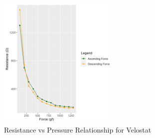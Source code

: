 \begin{figure}[b]
    \vspace{-0.7cm}
      \centering
      \includegraphics[width=0.5\textwidth]{figs/ascending_descending.png}
      \vspace{-0.2cm}
      \caption[Resistance vs Pressure Relationship]{Resistance vs Pressure Relationship for Velostat}
      \label{fig:velostat}
\vspace{1.0cm}
\end{figure}
